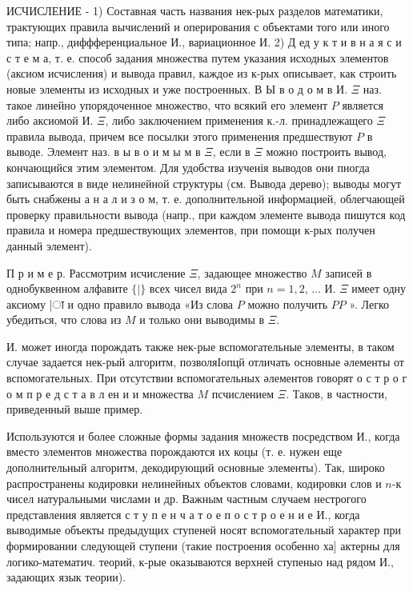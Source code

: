 \documentclass[10pt]{article}
\begin{document}
ИСЧИСЛЕНИЕ - 1) Составная часть названия нек-рых разделов математики, трактующих правила вычислений и оперирования с объектами того или иного типа; напр., диффференциальное И., вариационное И. 2) Д ед у к т и в н а я с и с т е м а, т. е. способ задания множества путем указания исходных элементов (аксиом исчисления) и вывода правил, каждое из к-рых описывает, как строить новые элементы из исходных и уже построенных. В Ы в о д о м в И. $\Xi$ наз. такое линейно упорядоченное множество, что всякий его элемент $P$ является либо аксиомой И. $\Xi$, либо заключением применения к.-л. принадлежащего $\Xi$ правила вывода, причем все посылки этого применения предшествуют $P$ в выводе. Элемент наз. в ы в о и м ы м в $\Xi$, если в $\Xi$ можно построить вывод, кончающийся этим элементом. Для удобства изученія выводов они пногда записываются в виде нелинейной структуры (см. Вывода дерево); выводы могут быть снабжены а н а л и з о м, т. е. дополнительной информацией, облегчающей проверку правильности вывода (напр., при каждом элементе вывода пишутся код правила и номера предшествующих элементов, при помощи к-рых получен данный элемент).



П р и м е р. Рассмотрим исчисление $\Xi$, задающее множество $M$ записей в однобуквенном алфавите $\{\mid\}$ всех чисел вида $2^{n}$ при $n=1,2$, ... И. $\Xi$ имеет одну аксиому |ा и одно правило вывода «Из слова $P$ можно получить $P P$ ». Легко убедиться, что слова из $M$ и только они выводимы в $\Xi$.



И. может иногда порождать также нек-рые вспомогательные элементы, в таком случае задается нек-рый алгоритм, позволяІопцй отличать основные әлементы от вспомогательных. При отсутствии вспомогательных әлементов говорят о с т р о г о м п р е д с т а в л ен и и множества $M$ псчислением $\Xi$. Таков, в частности, приведенный выше пример.



Используются и более сложные формы задания множеств посредством И., когда вместо элементов множества порождаются их коцы (т. е. нужен еще дополнительный алгоритм, декодирующий основные элементы). Так, широко распространены кодировки нелинейных объектов словами, кодировки слов и $n$-к чисел натуральными числами и др. Важным частным случаем нестрогого представления является с т у п е н ч а т о е п о с т р о е н и е И., когда выводимые объекты предыдущих ступеней носят вспомогательный характер при формировании следующей ступени (такие построения особенно ха] актерны для логико-математич. теорий, к-рые оказываются верхней ступеныо над рядом И., задающих язык теории).
\end{document}

